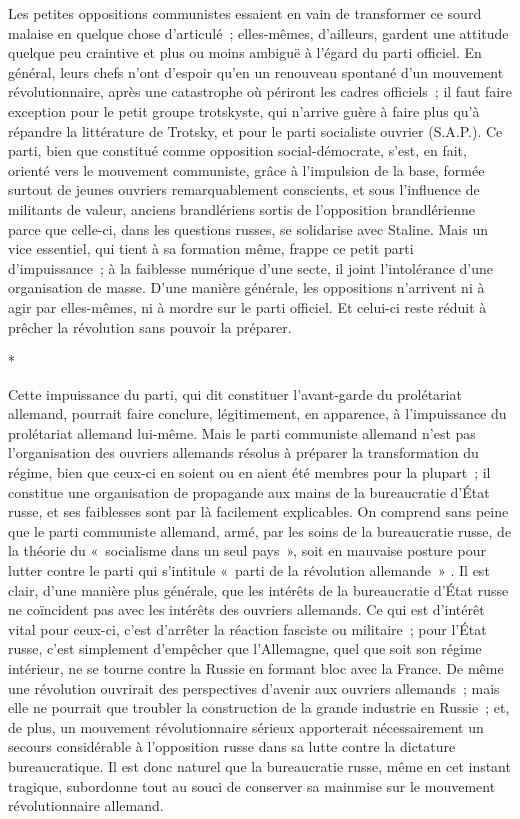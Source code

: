 \documentclass[french,twoside]{book} %
\begin{document}
Les petites oppositions communistes essaient en vain de transformer ce sourd malaise en quelque chose d'articulé ; elles-mêmes, d'ailleurs, gardent une attitude quelque peu craintive et plus ou moins ambiguë à l'égard du parti officiel. En général, leurs chefs n'ont d'espoir qu'en un renouveau spontané d'un mouvement révolutionnaire, après une catastrophe où périront les cadres officiels ; il faut faire exception pour le petit groupe trotskyste, qui n'arrive guère à faire plus qu'à répandre la littérature de Trotsky, et pour le parti socialiste ouvrier (S.A.P.). Ce parti, bien que constitué comme opposition social-démocrate, s'est, en fait, orienté vers le mouvement communiste, grâce à l'impulsion de la base, formée surtout de jeunes ouvriers remarquablement conscients, et sous l'influence de militants de valeur, anciens brandlériens sortis de l'opposition brandlérienne parce que celle-ci, dans les questions russes, se solidarise avec Staline. Mais un vice essentiel, qui tient à sa forma­tion même, frappe ce petit parti d'impuissance ; à la faiblesse numérique d'une secte, il joint l'intolérance d'une organisation de masse. D'une manière générale, les oppositions n'arrivent ni à agir par elles-mêmes, ni à mordre sur le parti officiel. Et celui-ci reste réduit à prêcher la révolution sans pouvoir la préparer.\par
\par

\begin{center}
*\end{center}
\noindent Cette impuissance du parti, qui dit constituer l'avant-garde du prolétariat allemand, pourrait faire conclure, légitimement, en apparence, à l'impuissance du prolétariat allemand lui-même. Mais le parti communiste allemand n'est pas l'organisation des ouvriers allemands résolus à préparer la transformation du régime, bien que ceux-ci en soient ou en aient été membres pour la plu­part ; il constitue une organisation de propagande aux mains de la bureaucratie d'État russe, et ses faiblesses sont par là facilement explicables. On comprend sans peine que le parti communiste allemand, armé, par les soins de la bureaucratie russe, de la théorie du « socialisme dans un seul pays », soit en mauvaise posture pour lutter contre le parti qui s'intitule « parti de la révolu­tion allemande » . Il est clair, d'une manière plus générale, que les intérêts de la bureaucratie d'État russe ne coïncident pas avec les intérêts des ouvriers allemands. Ce qui est d'intérêt vital pour ceux-ci, c'est d'arrêter la réaction fasciste ou militaire ; pour l'État russe, c'est simplement d'empêcher que l'Allemagne, quel que soit son régime intérieur, ne se tourne contre la Russie en formant bloc avec la France. De même une révolution ouvrirait des pers­pectives d'avenir aux ouvriers allemands ; mais elle ne pourrait que troubler la construction de la grande industrie en Russie ; et, de plus, un mouvement révolutionnaire sérieux apporterait nécessairement un secours considérable à l'opposition russe dans sa lutte contre la dictature bureaucratique. Il est donc naturel que la bureaucratie russe, même en cet instant tragique, subordonne tout au souci de conserver sa mainmise sur le mouvement révolutionnaire allemand.\par
\end{document}
